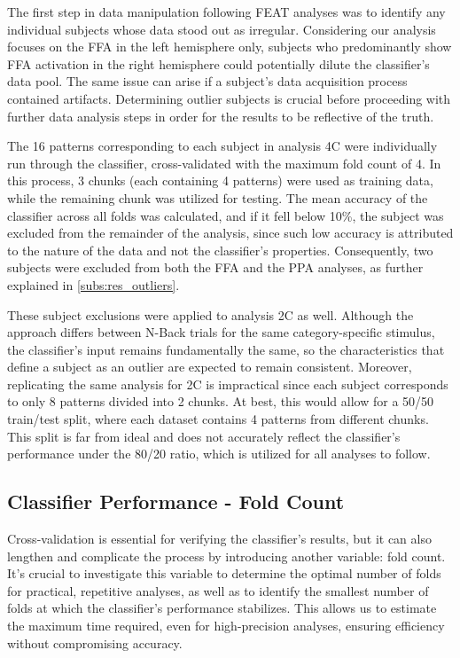 The first step in data manipulation following \gls{FEAT} analyses was to identify any individual subjects whose data stood out as irregular. Considering our analysis focuses on the \gls{FFA} in the left hemisphere only, subjects who predominantly show \gls{FFA} activation in the right hemisphere could potentially dilute the classifier's data pool. The same issue can arise if a subject's data acquisition process contained artifacts. Determining outlier subjects is crucial before proceeding with further data analysis steps in order for the results to be reflective of the truth.

The 16 patterns corresponding to each subject in analysis \gls{4C} were individually run through the classifier, cross-validated with the maximum fold count of 4. In this process, 3 chunks (each containing 4 patterns) were used as training data, while the remaining chunk was utilized for testing. The mean accuracy of the classifier across all folds was calculated, and if it fell below 10\%, the subject was excluded from the remainder of the analysis, since such low accuracy is attributed to the nature of the data and not the classifier's properties. Consequently, two subjects were excluded from both the \gls{FFA} and the \gls{PPA} analyses, as further explained in \autoref{subs:res_outliers}.

These subject exclusions were applied to analysis \gls{2C} as well. Although the approach differs between N-Back trials for the same category-specific stimulus, the classifier's input remains fundamentally the same, so the characteristics that define a subject as an outlier are expected to remain consistent. Moreover, replicating the same analysis for \gls{2C} is impractical since each subject corresponds to only 8 patterns divided into 2 chunks. At best, this would allow for a 50/50 train/test split, where each dataset contains 4 patterns from different chunks. This split is far from ideal and does not accurately reflect the classifier's performance under the 80/20 ratio, which is utilized for all analyses to follow.

\subsection{Classifier Performance - Fold Count}

Cross-validation is essential for verifying the classifier's results, but it can also lengthen and complicate the process by introducing another variable: fold count. It's crucial to investigate this variable to determine the optimal number of folds for practical, repetitive analyses, as well as to identify the smallest number of folds at which the classifier's performance stabilizes. This allows us to estimate the maximum time required, even for high-precision analyses, ensuring efficiency without compromising accuracy.

